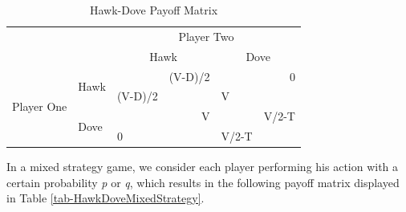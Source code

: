 \documentclass[a4paper, 11pt]{article}
\begin{document}
\begin{table}[H]
\centering
\caption{Hawk-Dove Payoff Matrix}
\label{tab-HawkDoveOriginal}
\begin{tabular}{cl|ll|ll|}
\multicolumn{1}{l}{}                             &                       & \multicolumn{4}{c|}{Player Two}                                             \\ \cline{3-6} 
\multicolumn{1}{l}{}                             &                       & \multicolumn{2}{c|}{Hawk}              & \multicolumn{2}{c|}{Dove}          \\ \hline
\multicolumn{1}{c|}{\multirow{4}{*}{Player One}} & \multirow{2}{*}{Hawk} &         & \multicolumn{1}{r|}{(V-D)/2} &       & \multicolumn{1}{r|}{0}     \\
\multicolumn{1}{c|}{}                            &                       & (V-D)/2 &                              & V     &                            \\ \cline{2-6} 
\multicolumn{1}{c|}{}                            & \multirow{2}{*}{Dove} &         & \multicolumn{1}{r|}{V}       &       & \multicolumn{1}{r|}{V/2-T} \\
\multicolumn{1}{c|}{}                            &                       & 0       &                              & V/2-T &                            \\ \hline
\end{tabular}
\end{table}

In a mixed strategy game, we consider each player performing his action with a certain probability \textit{p} or \textit{q}, which results in the following payoff matrix displayed in Table \ref{tab-HawkDoveMixedStrategy}.
\end{document}
